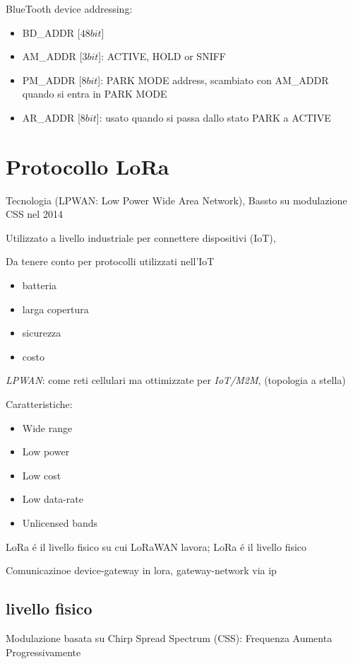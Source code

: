 \documentclass{article}
\begin{document}
BlueTooth device addressing:
\begin{itemize}
    \item BD\_ADDR [$48 bit$]
    \item AM\_ADDR [$3 bit$]: ACTIVE, HOLD or SNIFF
    \item PM\_ADDR [$8 bit$]: PARK MODE address, scambiato con AM\_ADDR quando si entra in PARK MODE
    \item AR\_ADDR [$8 bit$]: usato quando si passa dallo stato PARK a ACTIVE
\end{itemize}

\section{Protocollo LoRa}
Tecnologia (LPWAN: Low Power Wide Area Network), Bassto su modulazione CSS nel 2014

Utilizzato a livello industriale per connettere dispositivi (IoT),

Da tenere conto per protocolli utilizzati nell'IoT
\begin{itemize}
    \item batteria
    \item larga copertura
    \item sicurezza
    \item costo
\end{itemize}

\textit{LPWAN}: come reti cellulari ma ottimizzate per \textit{IoT/M2M}, (topologia a stella)

Caratteristiche:
\begin{itemize}
    \item Wide range
    \item Low power
    \item Low cost
    \item Low data-rate
    \item Unlicensed bands
\end{itemize}

LoRa \'e il livello fisico su cui LoRaWAN lavora; LoRa \'e il livello fisico

Comunicazinoe device-gateway in lora, gateway-network via ip

\subsection{livello fisico}
Modulazione basata su Chirp Spread Spectrum (CSS): Frequenza Aumenta Progressivamente
\end{document}
